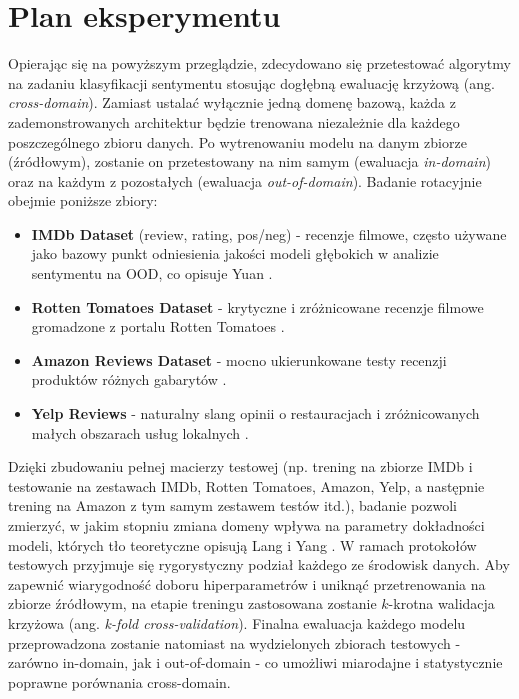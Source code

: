 \documentclass[runningheads]{llncs}
\begin{document}
\section*{Plan eksperymentu}
Opierając się na powyższym przeglądzie, zdecydowano się przetestować algorytmy na zadaniu klasyfikacji sentymentu stosując dogłębną ewaluację krzyżową (ang. \textit{cross-domain}). Zamiast ustalać wyłącznie jedną domenę bazową, każda z zademonstrowanych architektur będzie trenowana niezależnie dla każdego poszczególnego zbioru danych. Po wytrenowaniu modelu na danym zbiorze (źródłowym), zostanie on przetestowany na nim samym (ewaluacja \textit{in-domain}) oraz na każdym z pozostałych (ewaluacja \textit{out-of-domain}). Badanie rotacyjnie obejmie poniższe zbiory:
\begin{itemize}
    \item \textbf{IMDb Dataset} (review, rating, pos/neg) - recenzje filmowe, często używane jako bazowy punkt odniesienia jakości modeli głębokich w analizie sentymentu na OOD, co opisuje Yuan \cite{Yuan2026EmpiricalSO} \cite{imdb_dataset}.
    \item \textbf{Rotten Tomatoes Dataset} - krytyczne i zróżnicowane recenzje filmowe gromadzone z portalu Rotten Tomatoes \cite{rotten_tomatoes}.
    \item \textbf{Amazon Reviews Dataset} - mocno ukierunkowane testy recenzji produktów różnych gabarytów \cite{amazon_reviews}.
    \item \textbf{Yelp Reviews} - naturalny slang opinii o restauracjach i zróżnicowanych małych obszarach usług lokalnych \cite{yelp_dataset}.
\end{itemize}
Dzięki zbudowaniu pełnej macierzy testowej (np. trening na zbiorze IMDb i testowanie na zestawach IMDb, Rotten Tomatoes, Amazon, Yelp, a następnie trening na Amazon z tym samym zestawem testów itd.), badanie pozwoli zmierzyć, w jakim stopniu zmiana domeny wpływa na parametry dokładności modeli, których tło teoretyczne opisują Lang i Yang \cite{yang2023outofdistributiongeneralizationtextclassification,lang2023surveyoutofdistributiondetectionnlp}. W ramach protokołów testowych przyjmuje się rygorystyczny podział każdego ze środowisk danych. Aby zapewnić wiarygodność doboru hiperparametrów i uniknąć przetrenowania na zbiorze źródłowym, na etapie treningu zastosowana zostanie $k$-krotna walidacja krzyżowa (ang. \textit{k-fold cross-validation}). Finalna ewaluacja każdego modelu przeprowadzona zostanie natomiast na wydzielonych zbiorach testowych - zarówno in-domain, jak i out-of-domain - co umożliwi miarodajne i statystycznie poprawne porównania cross-domain.
\end{document}
